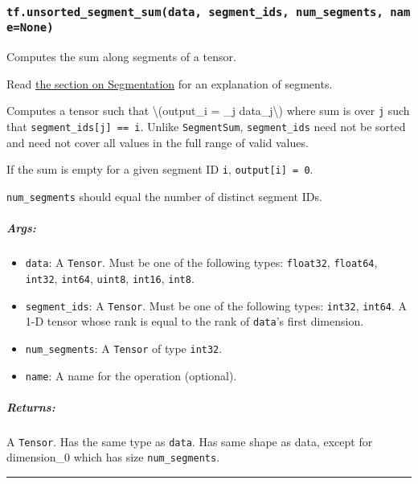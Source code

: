 \subsubsection{\texorpdfstring{\texttt{tf.unsorted\_segment\_sum(data,\ segment\_ids,\ num\_segments,\ name=None)}
}{tf.unsorted\_segment\_sum(data, segment\_ids, num\_segments, name=None) }}\label{tf.unsortedux5fsegmentux5fsumdata-segmentux5fids-numux5fsegments-namenone}

Computes the sum along segments of a tensor.

Read \href{../../api_docs/python/math_ops.md\#segmentation}{the section
on Segmentation} for an explanation of segments.

Computes a tensor such that \textbackslash{}(output\_i = \sum\_j
data\_j\textbackslash{}) where sum is over \texttt{j} such that
\texttt{segment\_ids{[}j{]}\ ==\ i}. Unlike \texttt{SegmentSum},
\texttt{segment\_ids} need not be sorted and need not cover all values
in the full range of valid values.

If the sum is empty for a given segment ID \texttt{i},
\texttt{output{[}i{]}\ =\ 0}.

\texttt{num\_segments} should equal the number of distinct segment IDs.

\subparagraph{Args: }\label{args-51}

\begin{itemize}
\tightlist
\item
  \texttt{data}: A \texttt{Tensor}. Must be one of the following types:
  \texttt{float32}, \texttt{float64}, \texttt{int32}, \texttt{int64},
  \texttt{uint8}, \texttt{int16}, \texttt{int8}.
\item
  \texttt{segment\_ids}: A \texttt{Tensor}. Must be one of the following
  types: \texttt{int32}, \texttt{int64}. A 1-D tensor whose rank is
  equal to the rank of \texttt{data}'s first dimension.
\item
  \texttt{num\_segments}: A \texttt{Tensor} of type \texttt{int32}.
\item
  \texttt{name}: A name for the operation (optional).
\end{itemize}

\subparagraph{Returns: }\label{returns-51}

A \texttt{Tensor}. Has the same type as \texttt{data}. Has same shape as
data, except for dimension\_0 which has size \texttt{num\_segments}.

\begin{center}\rule{0.5\linewidth}{\linethickness}\end{center}

